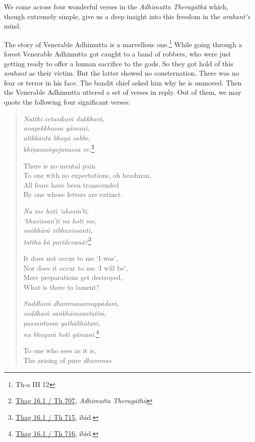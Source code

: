 We come across four wonderful verses in the \emph{Adhimutta Theragāthā} which, though extremely simple, give us a deep insight into this freedom in the \emph{arahant's} mind.

The story of Venerable Adhimutta is a marvellous one.\footnote{Th-a III 12} While going through a forest Venerable Adhimutta got caught to a band of robbers, who were just getting ready to offer a human sacrifice to the gods. So they got hold of this \emph{arahant} as their victim. But the latter showed no consternation. There was no fear or terror in his face. The bandit chief asked him why he is unmoved. Then the Venerable Adhimutta uttered a set of verses in reply. Out of them, we may quote the following four significant verses:

\begin{quote}
\emph{Natthi cetasikaṁ dukkhaṁ,}\\
\emph{anapekkhassa gāmani,}\\
\emph{atikkantā bhayā sabbe,}\\
\emph{khīṇasaṁyojanassa ve.}\footnote{\href{https://suttacentral.net/thag16.1/pli/ms}{Thag 16.1 / Th 707}, \emph{Adhimutta Theragāthā}}

There is no mental pain\\
To one with no expectations, oh headman,\\
All fears have been transcended\\
By one whose fetters are extinct.

\emph{Na me hoti `ahosin'ti,}\\
\emph{`bhavissan'ti na hoti me,}\\
\emph{saṅkhārā vibhavissanti,}\\
\emph{tattha kā paridevanā?}\footnote{\href{https://suttacentral.net/thag16.1/pli/ms}{Thag 16.1 / Th 715}, ibid.}

It does not occur to me `I was',\\
Nor does it occur to me `I will be',\\
Mere preparations get destroyed,\\
What is there to lament?

\emph{Suddhaṁ dhammasamuppādaṁ,}\\
\emph{suddhaṁ saṅkhārasantatiṁ,}\\
\emph{passantassa yathābhūtaṁ,}\\
\emph{na bhayaṁ hoti gāmani.}\footnote{\href{https://suttacentral.net/thag16.1/pli/ms}{Thag 16.1 / Th 716}, ibid.}

To one who sees as it is,\\
The arising of pure \emph{dhammas}


\end{quote}
